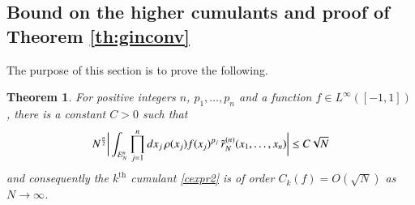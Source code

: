 \documentclass[11pt,reqno]{amsproc}
\newtheorem{theorem}{Theorem}
\numberwithin{equation}{section}
\numberwithin{theorem}{section}
\begin{document}
\subsection{Bound on the higher cumulants and proof of Theorem \ref{th:ginconv}}
\label{se:cumulantbound}
The purpose of this section is to prove the following.
\begin{theorem}
\label{th:cumulantbnd}
For positive integers $n$, $p_1,\ldots,p_n$ and a function $f \in L^{\infty}([-1,1])$, there is a constant $C>0$ such that 
\begin{equation}
N^{\frac{n}{2}}\bigg{|}\int_{\mathcal{E}_{N}^{n}}\prod_{j=1}^{n}dx_{j}\,\rho(x_j)f(x_j)^{p_j}\,\tilde{r}^{(n)}_{N}(x_1,\ldots,x_n)\bigg{|} \leq C\sqrt{N} \label{clusterint}
\end{equation}
and consequently the $k^{\mathrm{th}}$ cumulant \eqref{cexpr2} is of order $C_{k}(f) = O(\sqrt{N})$ as $N \to \infty$.
\end{theorem}
\end{document}
